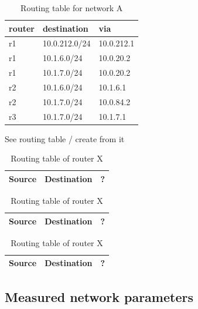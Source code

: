 \documentclass[parskip=full]{scrartcl}
\begin{document}
\begin{table}[hb]
    \centering
    \caption{Routing table for network A}
    \label{tab:routing}
    \begin{tabular}{lll}
        \toprule
        \textbf{router} & \textbf{destination} & \textbf{via}  \\ \midrule
        r1 & 10.0.212.0/24 &  10.0.212.1 \\
        r1 & 10.1.6.0/24   &  10.0.20.2 \\
        r1 & 10.1.7.0/24   &  10.0.20.2 \\
        \midrule
        r2 & 10.1.6.0/24 & 10.1.6.1 \\
        r2 & 10.1.7.0/24 & 10.0.84.2 \\
        \midrule
        r3 & 10.1.7.0/24 & 10.1.7.1\\
        \bottomrule
    \end{tabular}
\end{table}

See routing table / create from it
\begin{table}
    \centering
    \begin{tabular}{c c c }
       \hline
        Source & Destination & ? \\
       \hline 
       \hline
    \end{tabular}
    \caption{Routing table of router X}
    \label{tbl:routingTableX}
\end{table}

\begin{table}
    \centering
    \begin{tabular}{c c c }
       \hline
        Source & Destination & ? \\
       \hline 
       \hline
    \end{tabular}
    \caption{Routing table of router X}
    \label{tbl:routingTableX1}
\end{table}

\begin{table}
    \centering
    \begin{tabular}{c c c }
       \hline
        Source & Destination & ? \\
       \hline 
       \hline
    \end{tabular}
    \caption{Routing table of router X}
    \label{tbl:routingTableX2}
\end{table}

\subsection{Measured network parameters}
\end{document}
